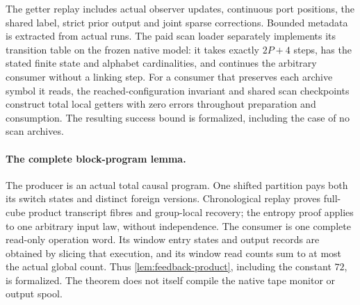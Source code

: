 The getter replay includes actual observer updates, continuous port positions,
the shared label, strict prior output and joint sparse corrections. Bounded
metadata is extracted from actual runs. The paid scan loader separately
implements its transition table on the frozen native model: it takes exactly
$2P+4$ steps, has the stated finite state and alphabet cardinalities, and
continues the arbitrary consumer without a linking step. For a consumer that
preserves each archive symbol it reads, the reached-configuration invariant
and shared scan checkpoints construct total local getters with zero errors
throughout preparation and consumption. The resulting success bound is
formalized, including the case of no scan archives.

\paragraph{The complete block-program lemma.}
The producer is an actual total causal program. One shifted partition pays
both its switch states and distinct foreign versions. Chronological replay
proves full-cube product transcript fibres and group-local recovery; the
entropy proof applies to one arbitrary input law, without independence.
The consumer is one complete read-only operation word. Its window entry
states and output records are obtained by slicing that execution, and its
window read counts sum to at most the actual global count. Thus
\cref{lem:feedback-product}, including the constant $72$, is formalized.
The theorem does not itself compile the native tape monitor or output spool.

